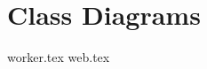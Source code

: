\documentclass{article}
\begin{document}
\section{Class Diagrams}

{worker.tex}
{web.tex}
\end{document}
